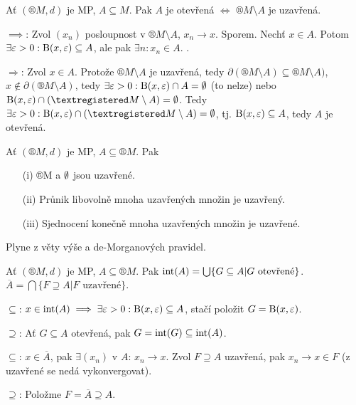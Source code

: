 \documentclass[12pt]{article}					%
\begin{document}
    \begin{veta}
        Ať $(®M, d)$ je MP, $A \subseteq M$. Pak $A$ je otevřená $\Leftrightarrow$ $®M \setminus A$ je uzavřená.

        \begin{dukazin}
            $\implies$: Zvol $(x_n)$ posloupnost v $®M \setminus A$, $x_n \rightarrow x$. Sporem. Nechť $x \in A$. Potom $\exists \varepsilon > 0: \operatorname{B}(x, \varepsilon) \subseteq A$, ale pak $\exists n: x_n \in A$. \lightning.

            $\Rightarrow$: Zvol $x \in A$. Protože $®M \setminus A$ je uzavřená, tedy $\partial(®M \setminus A) \subseteq ®M \setminus A)$, $x \notin \partial(®M \setminus A)$, tedy $\exists \varepsilon > 0: \operatorname{B}(x, \varepsilon) \cap A = \emptyset$ (to nelze) nebo $\B(x, \epsilon)\cap(®M\setminus A) = \O$. Tedy $\exists \epsilon > 0: \B(x, \epsilon) \cap (®M \setminus A) = \O$, tj. $\operatorname{B}(x, \varepsilon) \subseteq A$, tedy $A$ je otevřená.
        \end{dukazin}
    \end{veta}

    \begin{veta}
        Ať $(®M, d)$ je MP, $A \subseteq ®M$. Pak
        
        \begin{itemize}
            \item[(i)] ®M a $\emptyset$ jsou uzavřené.
            \item[(ii)] Průnik libovolně mnoha uzavřených množin je uzavřený.
            \item[(iii)] Sjednocení konečně mnoha uzavřených množin je uzavřené.
        \end{itemize}
        
        \begin{dukazin}
            Plyne z věty výše a de-Morganových pravidel.
        \end{dukazin}
    \end{veta}

    \begin{veta}
        Ať $(®M, d)$ je MP, $A \subseteq ®M$. Pak $\operatorname{int}(A) = \bigcup\{G \subseteq A | G \text{ otevřené}\}$. $\overline{A} = \bigcap\{F \supseteq A | F \text{ uzavřené}\}$.

        \begin{dukazin}
            $\subseteq$: $x \in \operatorname{int}(A) \implies \exists \varepsilon > 0: \operatorname{B}(x, \varepsilon) \subseteq A$, stačí položit $G = \operatorname{B}(x, \varepsilon)$.

            $\supseteq$: Ať $G \subseteq A$ otevřená, pak $G = \operatorname{int}(G) \subseteq \operatorname{int}(A)$.

            $\subseteq$: $x \in \overline{A}$, pak $\exists (x_n)$ v $A$: $x_n \rightarrow x$. Zvol $F \supseteq A$ uzavřená, pak $x_n \rightarrow x \in F$ (z uzavřené se nedá vykonvergovat).

            $\supseteq$: Položme $F = \overline{A} \supseteq A$.
        \end{dukazin}
    \end{veta}
\end{document}
